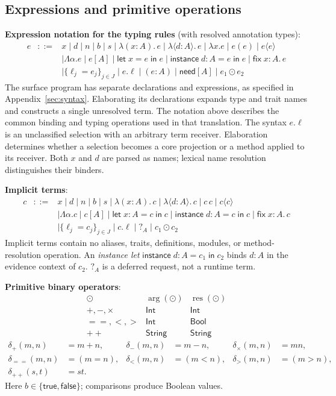 \documentclass[10pt,a4paper]{article}
\newcommand{\Int}{\mathsf{Int}}
\newcommand{\Str}{\mathsf{String}}
\newcommand{\Bool}{\mathsf{Bool}}
\newcommand{\need}[1]{\mathsf{need}[#1]}
\newcommand{\hole}[1]{?_{#1}}
\newcommand{\iarg}[1]{\langle#1\rangle}
\newcommand{\ilam}[3]{\lambda\langle#1:#2\rangle.\,#3}
\newcommand{\lam}[3]{\lambda(#1:#2).\,#3}
\newcommand{\fix}[3]{\mathsf{fix}\;#1:#2.\,#3}
\newcommand{\letin}[3]{\mathsf{let}\;#1=#2\;\mathsf{in}\;#3}
\newcommand{\instancelet}[4]{\mathsf{instance}\;#1:#2=#3\;\mathsf{in}\;#4}
\newcommand{\argop}[1]{\operatorname{arg}(#1)}
\newcommand{\resop}[1]{\operatorname{res}(#1)}
\begin{document}
\subsection{Expressions and primitive operations}
\label{sec:expression-notation}
\textbf{Expression notation for the typing rules} (with resolved annotation types):
\[
\begin{array}{rcl}
e&::=&x\mid d\mid n\mid b\mid s\mid\lam{x}{A}{e}\mid\ilam{d}{A}{e}\mid\lambda x.e
 \mid e(e)\mid e\iarg{e}\\
&&\mid\Lambda\alpha.e\mid e[A]\mid\letin{x}{e}{e}\mid\instancelet{d}{A}{e}{e}\mid\fix{x}{A}{e}\\
&&\mid\{\ell_j=e_j\}_{j\in J}\mid e.\ell\mid(e:A)\mid\need A
 \mid e_1\mathbin{\odot}e_2
\end{array}
\]
The surface program has separate declarations and expressions, as specified in
Appendix~\ref{sec:syntax}. Elaborating its declarations expands type and trait names
and constructs a single unresolved term. The notation above describes the common
binding and typing operations used in that translation.
The syntax $e.\ell$ is an unclassified selection with an arbitrary term receiver. Elaboration determines
whether a selection becomes a core projection or a method applied to its receiver.
Both $x$ and $d$ are parsed as names; lexical name resolution distinguishes their binders.

\textbf{Implicit terms}:
\[
\begin{array}{rcl}
c&::=&x\mid d\mid n\mid b\mid s\mid\lam{x}{A}{c}\mid\ilam{d}{A}{c}
 \mid c\,c\mid c\iarg{c}\\
&&\mid\Lambda\alpha.c\mid c[A]\mid\letin{x:A}{c}{c}\mid\instancelet{d}{A}{c}{c}\mid\fix{x}{A}{c}\\
&&\mid\{\ell_j=c_j\}_{j\in J}\mid c.\ell\mid\hole A
 \mid c_1\mathbin{\odot}c_2
\end{array}
\]
Implicit terms contain no aliases, traits, definitions, modules, or method-resolution operation.
An \emph{instance let} $\instancelet{d}{A}{c_1}{c_2}$ binds $d:A$ in the evidence
context of $c_2$. $\hole A$ is a deferred request, not a runtime term.

\textbf{Primitive binary operators}\label{sec:primitives}:
\[
\begin{array}{c|c|c}
\odot & \argop\odot & \resop\odot\\\hline
+,-,\times & \Int & \Int\\
\mathsf{==},<,> & \Int & \Bool\\
\mathbin{+\!+} & \Str & \Str
\end{array}
\]
\[
\begin{aligned}
\delta_+(m,n)&=m+n, &\delta_-(m,n)&=m-n, &\delta_\times(m,n)&=mn,\\
\delta_{==}(m,n)&=(m=n),&\delta_<(m,n)&=(m<n),&\delta_>(m,n)&=(m>n),\\
\delta_{++}(s,t)&=st.&&&&
\end{aligned}
\]
Here $b\in\{\mathsf{true},\mathsf{false}\}$; comparisons produce Boolean values.
\end{document}

